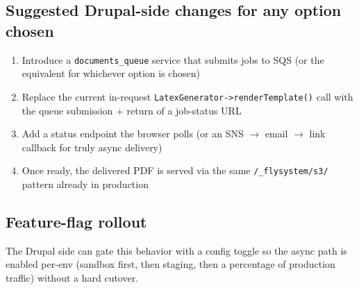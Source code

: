\documentclass[11pt,letterpaper]{article}
\begin{document}
\subsection{Suggested Drupal-side changes for any option chosen}
\begin{enumerate}[nosep]
  \item Introduce a \texttt{documents\_queue} service that submits jobs to SQS (or the equivalent for whichever option is chosen)
  \item Replace the current in-request \texttt{LatexGenerator->renderTemplate()} call with the queue submission + return of a job-status URL
  \item Add a status endpoint the browser polls (or an SNS $\rightarrow$ email $\rightarrow$ link callback for truly async delivery)
  \item Once ready, the delivered PDF is served via the same \texttt{/\_flysystem/s3/} pattern already in production
\end{enumerate}

\subsection{Feature-flag rollout}
The Drupal side can gate this behavior with a config toggle so the async path is enabled per-env (sandbox first, then staging, then a percentage of production traffic) without a hard cutover.

\newpage
\printindex
\end{document}
